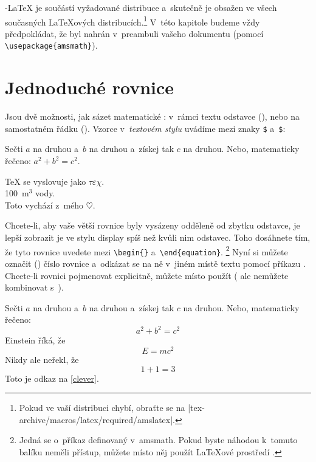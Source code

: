 \AmS-\LaTeX{} je součástí vyžadované distribuce a~skutečně je obsažen
ve všech současných \LaTeX ových distribucích.\footnote{Pokud ve vaší distribuci
chybí, obraťte se na \CTANalt|tex-archive/macros/latex/required/amslatex|.} V~této
kapitole budeme vždy předpokládat, že  byl nahrán v~preambuli
vašeho dokumentu (pomocí \verb|\usepackage{amsmath}|).

\section{Jednoduché rovnice}
  
Jsou dvě možnosti, jak sázet matematické : v~rámci textu
odstavce (\emph{}), nebo na samostatném řádku
(\textit{}). Vzorce
v~\emph{textovém stylu} uvádíme mezi  %
znaky \texttt{\$} a~\texttt{\$}:
\begin{example}
Sečti $a$ na druhou
a~$b$ na druhou
a~získej tak $c$ na druhou.
Nebo, matematicky řečeno:
$a^2 + b^2 = c^2$.
\end{example}
\begin{example}
\TeX{} se vyslovuje jako
$\tau\varepsilon\chi$.\\[5pt]
100~m$^{3}$ vody.\\[5pt]
Toto vychází z~mého $\heartsuit$.
\end{example}

Chcete-li, aby vaše větší rovnice byly vysázeny odděleně od zbytku
odstavce, je lepší zobrazit je ve stylu display spíš než 
kvůli nim odstavec. Toho dosáhnete tím, že tyto rovnice uvedete mezi
\verb|\begin{|\verb|}| a~\verb|\end{equation}|.%
\footnote{Jedná se o~příkaz definovaný v~\textsf{amsmath}. Pokud byste
náhodou k~tomuto balíku neměli přístup, můžete místo něj použít \LaTeX ové
prostředí .} Nyní si můžete označit () číslo
rovnice a~odkázat se na ně v~jiném místě textu pomocí příkazu .
Chcete-li rovnici pojmenovat explicitně, můžete místo  použít
 ( ale nemůžete kombinovat s~).
\begin{example}
Sečti $a$ na druhou
a~$b$ na druhou
a~získej tak $c$ na druhou.
Nebo, matematicky řečeno:
 \begin{equation}
   a^2 + b^2 = c^2
 \end{equation}
Einstein říká, že
 \begin{equation}
   E = mc^2 \label{clever}
 \end{equation}
Nikdy ale neřekl, že
 \begin{equation}
  1 + 1 = 3 \tag{lež}
 \end{equation}
Toto je odkaz na
\eqref{clever}. 
\end{example}

